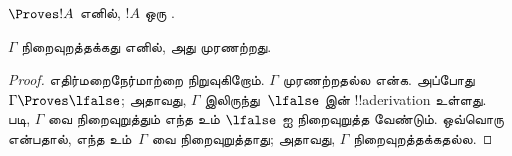 \documentclass[../../../include/open-logic-section]{subfiles}
\begin{document}
\begin{cor}
$\Proves !A$ எனில், $!A$ ஒரு .
\end{cor}

\begin{cor}
$\Gamma$ நிறைவுறத்தக்கது எனில், அது முரணற்றது.
\end{cor}

\begin{proof}
எதிர்மறைநேர்மாற்றை நிறுவுகிறோம். $\Gamma$ முரணற்றதல்ல என்க. அப்போது
$\Gamma \Proves \lfalse$; அதாவது, $\Gamma$ இலிருந்து~$\lfalse$ இன்
!!a{derivation} உள்ளது.  படி, $\Gamma$ வை
நிறைவுறுத்தும் எந்த
 உம்
$\lfalse$ ஐ நிறைவுறுத்த வேண்டும். ஒவ்வொரு
 என்பதால், எந்த
 உம்~$\Gamma$ வை நிறைவுறுத்தாது;
அதாவது, $\Gamma$ நிறைவுறத்தக்கதல்ல.
\end{proof}
\end{document}
